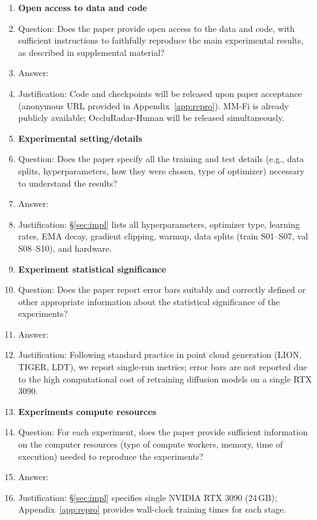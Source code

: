 \begin{enumerate}
\item {\bf Open access to data and code}
    \item[] Question: Does the paper provide open access to the data and code, with sufficient instructions to faithfully reproduce the main experimental results, as described in supplemental material?
    \item[] Answer: \answerNo{}
    \item[] Justification: Code and checkpoints will be released upon paper acceptance (anonymous URL provided in Appendix~\ref{app:repro}). MM-Fi is already publicly available; OccluRadar-Human will be released simultaneously.

\item {\bf Experimental setting/details}
    \item[] Question: Does the paper specify all the training and test details (e.g., data splits, hyperparameters, how they were chosen, type of optimizer) necessary to understand the results?
    \item[] Answer: \answerYes{}
    \item[] Justification: \S\ref{sec:impl} lists all hyperparameters, optimizer type, learning rates, EMA decay, gradient clipping, warmup, data splits (train S01--S07, val S08--S10), and hardware.

\item {\bf Experiment statistical significance}
    \item[] Question: Does the paper report error bars suitably and correctly defined or other appropriate information about the statistical significance of the experiments?
    \item[] Answer: \answerNo{}
    \item[] Justification: Following standard practice in point cloud generation (LION, TIGER, LDT), we report single-run metrics; error bars are not reported due to the high computational cost of retraining diffusion models on a single RTX 3090.

\item {\bf Experiments compute resources}
    \item[] Question: For each experiment, does the paper provide sufficient information on the computer resources (type of compute workers, memory, time of execution) needed to reproduce the experiments?
    \item[] Answer: \answerYes{}
    \item[] Justification: \S\ref{sec:impl} specifies single NVIDIA RTX 3090 (24\,GB); Appendix~\ref{app:repro} provides wall-clock training times for each stage.


\end{enumerate}
